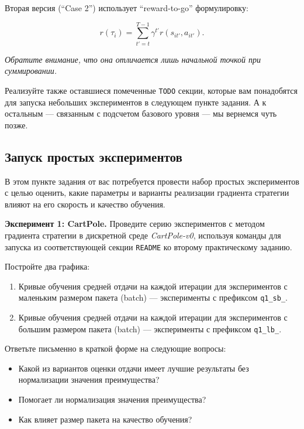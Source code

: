 \documentclass[12pt, oneside]{article}
\begin{document}
\noindent
Вторая версия (``Case 2'') использует ``reward-to-go'' формулировку:

\begin{equation}
    r(\tau_i) = \sum_{t' = t}^{T - 1} {\gamma^{t'} r(s_{it'}, a_{it'})}.
\end{equation}

\noindent
\textit{Обратите внимание, что она отличается лишь начальной точкой при суммировании.}

Реализуйте также оставшиеся помеченные \verb|TODO| секции, которые вам понадобятся для запуска небольших экспериментов в следующем пункте задания. А к остальным --- связанным с подсчетом базового уровня --- мы вернемся чуть позже.

\subsection{Запуск простых экспериментов}

В этом пункте задания от вас потребуется провести набор простых экспериментов с целью оценить, какие параметры и варианты реализации градиента стратегии влияют на его скорость и качество обучения.

\textbf{Эксперимент 1: CartPole.} Проведите серию экспериментов с методом градиента стратегии в дискретной среде \textit{CartPole-v0}, используя команды для запуска из соответствующей секции \verb|README| ко второму практическому заданию.

Постройте два графика:

\begin{enumerate}
    \item Кривые обучения средней отдачи на каждой итерации для экспериментов с маленьким размером пакета (batch) --- эксперименты с префиксом \verb|q1_sb_|.
    \item Кривые обучения средней отдачи на каждой итерации для экспериментов с большим размером пакета (batch) --- эксперименты с префиксом \verb|q1_lb_|.
\end{enumerate}

Ответьте письменно в краткой форме на следующие вопросы:

\begin{itemize}
    \item Какой из вариантов оценки отдачи имеет лучшие результаты без нормализации значения преимущества?
    \item Помогает ли нормализация значения преимущества?
    \item Как влияет размер пакета на качество обучения?
\end{itemize}
\end{document}

